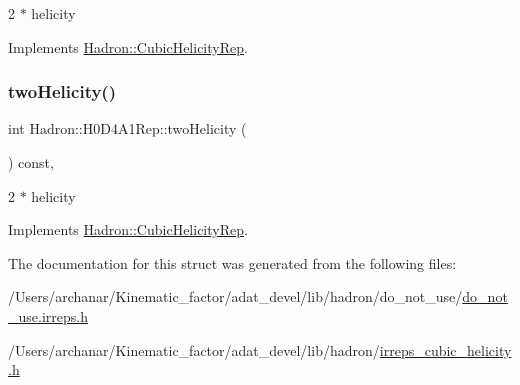2 $\ast$ helicity 

Implements \mbox{\hyperlink{structHadron_1_1CubicHelicityRep_af507aa56fc2747eacc8cb6c96db31ecc}{Hadron\+::\+Cubic\+Helicity\+Rep}}.

\mbox{\label{structHadron_1_1H0D4A1Rep_a2aa89f84616ec32830d7b607b5a0b513}} 
\subsubsection{\texorpdfstring{twoHelicity()}{twoHelicity()}\hspace{0.1cm}{\footnotesize\ttfamily [2/2]}}
{\footnotesize\ttfamily int Hadron\+::\+H0\+D4\+A1\+Rep\+::two\+Helicity (\begin{DoxyParamCaption}{ }\end{DoxyParamCaption}) const\hspace{0.3cm}{\ttfamily [inline]}, {\ttfamily [virtual]}}

2 $\ast$ helicity 

Implements \mbox{\hyperlink{structHadron_1_1CubicHelicityRep_af507aa56fc2747eacc8cb6c96db31ecc}{Hadron\+::\+Cubic\+Helicity\+Rep}}.



The documentation for this struct was generated from the following files\+:\begin{DoxyCompactItemize}
\item 
/\+Users/archanar/\+Kinematic\+\_\+factor/adat\+\_\+devel/lib/hadron/do\+\_\+not\+\_\+use/\mbox{\hyperlink{do__not__use_8irreps_8h}{do\+\_\+not\+\_\+use.\+irreps.\+h}}\item 
/\+Users/archanar/\+Kinematic\+\_\+factor/adat\+\_\+devel/lib/hadron/\mbox{\hyperlink{lib_2hadron_2irreps__cubic__helicity_8h}{irreps\+\_\+cubic\+\_\+helicity.\+h}}\end{DoxyCompactItemize}
